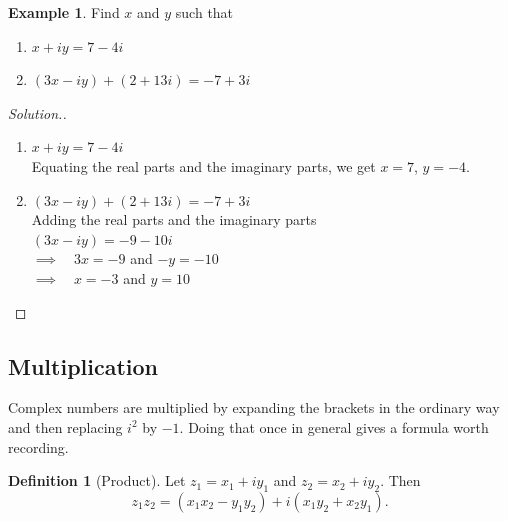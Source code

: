 \documentclass[11pt,a4paper]{article}
\theoremstyle{definition}
\newtheorem{definition}[thm]{Definition}
\newtheorem{example}[thm]{Example}
\newenvironment{solution}
  {\renewcommand{\qedsymbol}{}\begin{proof}[\textit{Solution}.]}
  {\end{proof}}
\begin{document}
\begin{example}

Find $x$ and $y$ such that
\begin{enumerate}
\item $x+iy=7-4i$

\item $(3x-iy)+(2+13i)=-7+3i$\\
\end{enumerate}
\end{example}
\begin{solution}

\begin{enumerate}
\item $x+iy=7-4i$ \\
Equating the real parts and the imaginary parts, we get $x=7$, $y=-4$.

\item $(3x-iy)+(2+13i) =-7+3i$\\
Adding the real parts and the imaginary parts\\
$(3x-iy)=-9-10i$\\
$\implies \quad  3x=-9$ and $-y=-10$\\
$\implies \quad  x=-3$ and $y=10$\\
\end{enumerate}
\end{solution}

\subsection{Multiplication}
Complex numbers are multiplied by expanding the brackets in the ordinary way and
then replacing $i^{2}$ by $-1$. Doing that once in general gives a formula worth
recording.

\begin{definition}[Product]
Let $z_1=x_1+iy_1$ and $z_2=x_2+iy_2$. Then
$$z_1z_2=\left(x_1x_2-y_1y_2\right)+i\left(x_1y_2+x_2y_1\right).$$
\end{definition}
\end{document}
